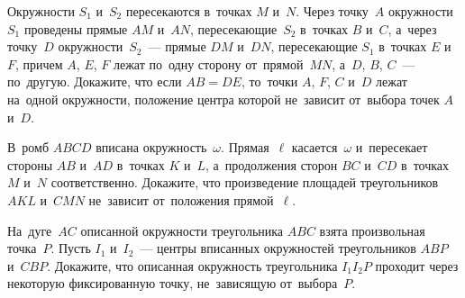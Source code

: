 \begin{problems}
\item
Окружности $S_{1}$ и~$S_{2}$ пересекаются в~точках $M$ и~$N$.
Через точку~$A$ окружности~$S_{1}$ проведены прямые $AM$ и~$AN$,
пересекающие~$S_{2}$ в~точках $B$ и~$C$, а~через точку~$D$
окружности~$S_{2}$~— прямые $DM$ и~$DN$, пересекающие $S_{1}$
в~точках $E$ и~$F$, причем $A$, $E$, $F$ лежат по~одну сторону от~прямой~$MN$,
а~$D$, $B$, $C$~— по~другую.
Докажите, что если $AB = DE$, то~точки $A$, $F$, $C$ и~$D$ лежат на~одной
окружности, положение центра которой не~зависит от~выбора точек $A$ и~$D$.

\item
В~ромб $ABCD$ вписана окружность~$\omega$.
Прямая~$\ell$ касается~$\omega$ и~пересекает стороны $AB$ и~$AD$
в~точках $K$ и~$L$, а~продолжения сторон $BC$ и~$CD$ в~точках $M$ и~$N$
соответственно.
Докажите, что произведение площадей треугольников $AKL$ и~$CMN$ не~зависит
от~положения прямой~$\ell$.

\item
На~дуге~$AC$ описанной окружности треугольника $ABC$ взята произвольная
точка~$P$.
Пусть $I_1$ и~$I_2$~— центры вписанных окружностей
треугольников $ABP$ и~$CBP$.
Докажите, что описанная окружность треугольника $I_1 I_2 P$ проходит через
некоторую фиксированную точку, не~зависящую от~выбора~$P$.

\end{problems}

